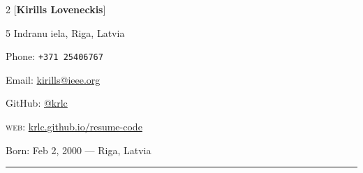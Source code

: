 
\begin{multicols}{2}
[\textbf{\Large{Kirills Loveneckis}}]

5 Indranu iela, Riga, Latvia\par
Phone: \texttt{+371 25406767}\par
Email: \href{mailto:kirills@ieee.org}{kirills@ieee.org}\par

GitHub: \href{https://github.com/krlc}{@krlc}\par
\textsc{web}: \href{https://krlc.github.io/resume-code/}{krlc.github.io/resume-code}\par 
Born:  Feb 2, 2000 --- Riga, Latvia

\end{multicols}
\hrule
